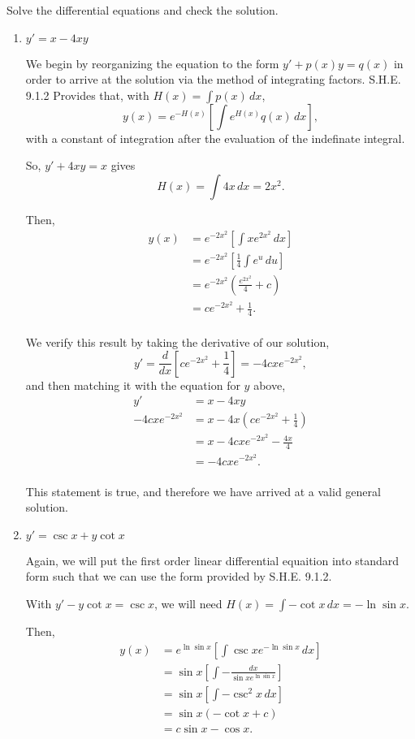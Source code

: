 \documentclass[../hw5]{subfiles}
\begin{document}
Solve the differential equations and check the solution.
\begin{enumerate}[label= (\alph*)]
    \item $y'=x-4xy$
    
    We begin by reorganizing the equation to the form $y'+p(x)y=q(x)$ in order to arrive at the solution via the method of integrating factors. S.H.E. 9.1.2 Provides that, with $H(x)=\int p(x)\,dx$,
    \[y(x)=e^{-H(x)}\left[ \int e^{H(x)}q(x)\,dx \right],\] with a constant of integration after the evaluation of the indefinate integral.

    So, $y'+4xy=x$ gives \[H(x)=\int 4x\,dx=2x^2.\]

    Then,
    \begin{align*}
        y(x)&=e^{-2x^2}\left[ \int xe^{2x^2}\,dx \right] \\
        &=e^{-2x^2}\left[ \frac{1}{4}\int e^u\,du \right] \\
        &=e^{-2x^2}\left( \frac{e^{2x^2}}{4}+c \right) \\
        &=ce^{-2x^2}+\frac{1}{4}. \\
    \end{align*}

    
    We verify this result by taking the derivative of our solution, 
    \[y'=\frac{d}{dx}\left[ ce^{-2x^2}+\frac{1}{4} \right]=-4cxe^{-2x^2},\]
    and then matching it with the equation for $y$ above,
    \begin{align*}
        y'&=x-4xy\\
        -4cxe^{-2x^2}&=x-4x\left( ce^{-2x^2}+\frac{1}{4} \right) \\
        &=x-4cxe^{-2x^2}-\frac{4x}{4} \\
        &=-4cxe^{-2x^2}. \\
    \end{align*}

    This statement is true, and therefore we have arrived at a valid general solution.

    \item $y'=\csc{x}+y\cot{x}$
    
    Again, we will put the first order linear differential equaition into standard form such that we can use the form provided by S.H.E. 9.1.2.

    With $y'-y\cot{x}=\csc{x}$, we will need $H(x)=\int-\cot{x}\,dx=-\ln{\sin{x}}$.

    Then,
    \begin{align*}
        y(x)&=e^{\ln{\sin{x}}}\left[ \int \csc{x}e^{-\ln{\sin{x}}}\,dx \right] \\
        &=\sin{x}\left[ \int-\frac{dx}{\sin{x}e^{\ln{\sin{x}}}} \right] \\
        &=\sin{x}\left[ \int-\csc^2{x}\,dx \right] \\
        &=\sin{x}\left( -\cot{x}+c \right) \\
        &=c\sin{x}-\cos{x}. \\
    \end{align*}


\end{enumerate}
\end{document}
